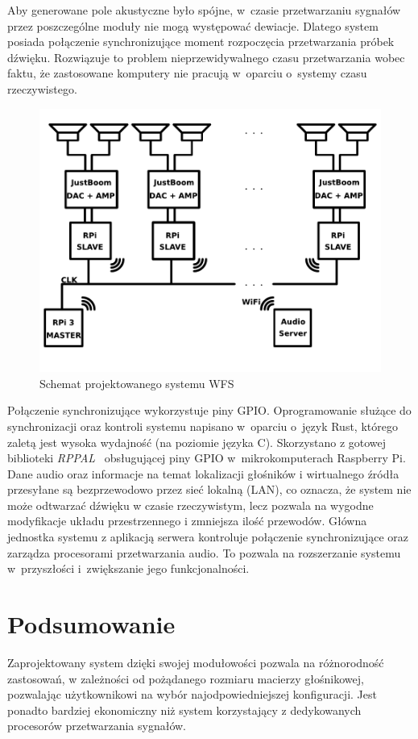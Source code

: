 \documentclass[10pt, a4paper]{article}
\let\Oldsection\section
\renewcommand{\section}{\FloatBarrier\Oldsection}
\begin{document}
Aby generowane pole akustyczne było spójne, w~czasie przetwarzaniu sygnałów przez
poszczególne moduły nie mogą występować dewiacje. Dlatego system posiada połączenie
synchronizujące moment rozpoczęcia przetwarzania próbek dźwięku.
Rozwiązuje to problem nieprzewidywalnego czasu przetwarzania wobec faktu, że
zastosowane komputery nie pracują w~oparciu o~systemy czasu rzeczywistego.

\begin{figure}[H]
  \centering
  \includegraphics[width=.7\textwidth]{./vecgraphics/scheme3.pdf}
  \caption{Schemat projektowanego systemu WFS}
  \label{fig:schemat}
\end{figure}

Połączenie synchronizujące wykorzystuje piny GPIO. Oprogramowanie służące do
synchronizacji oraz kontroli systemu napisano w~oparciu o~język Rust, którego
zaletą jest wysoka wydajność (na poziomie języka C). Skorzystano z gotowej
biblioteki \emph{RPPAL}~\cite{RPPAL} obsługującej piny GPIO w~mikrokomputerach
Raspberry Pi. Dane audio oraz informacje na temat lokalizacji głośników i
wirtualnego źródła przesyłane są bezprzewodowo przez sieć lokalną (LAN), co
oznacza, że system nie może odtwarzać dźwięku w czasie rzeczywistym, lecz
pozwala na wygodne modyfikacje układu przestrzennego i zmniejsza ilość
przewodów. Główna jednostka systemu z aplikacją serwera kontroluje połączenie
synchronizujące oraz zarządza procesorami przetwarzania audio. To pozwala na rozszerzanie
systemu w~przyszłości i~zwiększanie jego funkcjonalności.

\section{Podsumowanie}

Zaprojektowany system dzięki swojej modułowości pozwala na różnorodność
zastosowań, w zależności od pożądanego rozmiaru macierzy głośnikowej,
pozwalając użytkownikowi na wybór najodpowiedniejszej konfiguracji. Jest
ponadto bardziej ekonomiczny niż system korzystający z dedykowanych procesorów
przetwarzania sygnałów.
\end{document}
